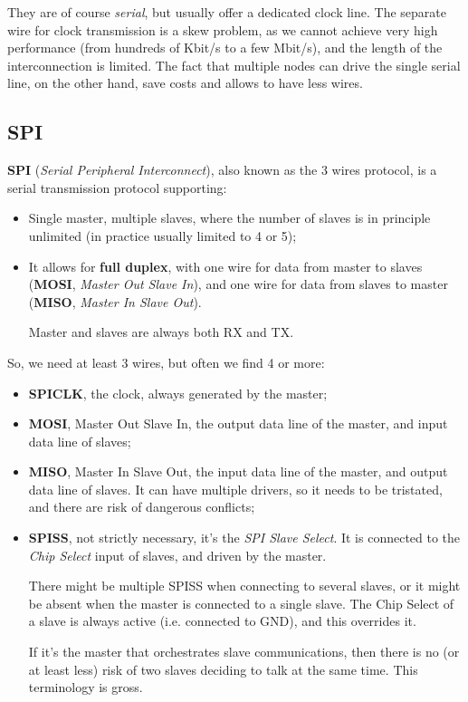 \documentclass[a4paper,11pt]{article}
\begin{document}
They are of course \textit{serial}, but usually offer a dedicated clock line.
The separate wire for clock transmission is a skew problem, as we cannot achieve very high performance (from hundreds of Kbit/s to a few Mbit/s), and the length of the interconnection is limited.
The fact that multiple nodes can drive the single serial line, on the other hand, save costs and allows to have less wires.

\subsection{SPI}

\textbf{SPI} (\textit{Serial Peripheral Interconnect}), also known as the 3 wires protocol, is a serial transmission protocol supporting:
\begin{itemize}
	\item Single master, multiple slaves, where the number of slaves is in principle unlimited (in practice usually limited to 4 or 5);
	\item It allows for \textbf{full duplex}, with one wire for data from master to slaves (\textbf{MOSI}, \textit{Master Out Slave In}), and one wire for data from slaves to master (\textbf{MISO}, \textit{Master In Slave Out}).

		Master and slaves are always both RX and TX.
\end{itemize}

So, we need at least 3 wires, but often we find 4 or more:
\begin{itemize}
	\item \textbf{SPICLK}, the clock, always generated by the master;
	\item \textbf{MOSI}, Master Out Slave In, the output data line of the master, and input data line of slaves;
	\item \textbf{MISO}, Master In Slave Out, the input data line of the master, and output data line of slaves. It can have multiple drivers, so it needs to be tristated, and there are risk of dangerous conflicts;
	\item \textbf{SPISS}, not strictly necessary, it's the \textit{SPI Slave Select}. It is connected to the \textit{Chip Select} input of slaves, and driven by the master.

		There might be multiple SPISS when connecting to several slaves, or it might be absent when the master is connected to a single slave. The Chip Select of a slave is always active (i.e. connected to GND), and this overrides it.

		If it's the master that orchestrates slave communications, then there is no (or at least less) risk of two slaves deciding to talk at the same time. This terminology is gross.
\end{itemize}
\end{document}
